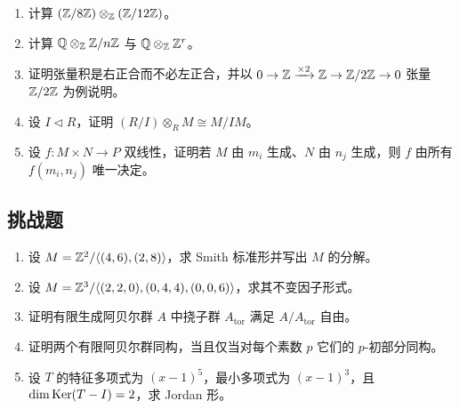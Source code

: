 \begin{enumerate}[resume, label=\textbf{\arabic*.}, leftmargin=*, itemsep=0.5em]
\item \medium 计算 $(\mathbb{Z}/8\mathbb{Z})\otimes_{\mathbb{Z}} (\mathbb{Z}/12\mathbb{Z})$。
\item \medium 计算 $\mathbb{Q}\otimes_{\mathbb{Z}} \mathbb{Z}/n\mathbb{Z}$ 与 $\mathbb{Q}\otimes_{\mathbb{Z}} \mathbb{Z}^r$。
\item \medium 证明张量积是右正合而不必左正合，并以 $0\to \mathbb{Z}\xrightarrow{\times 2}\mathbb{Z}\to \mathbb{Z}/2\mathbb{Z}\to 0$ 张量 $\mathbb{Z}/2\mathbb{Z}$ 为例说明。
\item \medium 设 $I\triangleleft R$，证明 $(R/I)\otimes_R M\cong M/IM$。
\item \medium 设 $f:M\times N\to P$ 双线性，证明若 $M$ 由 $m_i$ 生成、$N$ 由 $n_j$ 生成，则 $f$ 由所有 $f(m_i,n_j)$ 唯一决定。
\end{enumerate}

\subsection*{挑战题}
\begin{enumerate}[resume, label=\textbf{\arabic*.}, leftmargin=*, itemsep=0.5em]
\item \hard 设 $M=\mathbb{Z}^2/\langle (4,6),(2,8)\rangle$，求 Smith 标准形并写出 $M$ 的分解。
\item \hard 设 $M=\mathbb{Z}^3/\langle (2,2,0),(0,4,4),(0,0,6)\rangle$，求其不变因子形式。
\item \hard 证明有限生成阿贝尔群 $A$ 中挠子群 $A_{\mathrm{tor}}$ 满足 $A/A_{\mathrm{tor}}$ 自由。
\item \hard 证明两个有限阿贝尔群同构，当且仅当对每个素数 $p$ 它们的 $p$-初部分同构。
\item \hard 设 $T$ 的特征多项式为 $(x-1)^5$，最小多项式为 $(x-1)^3$，且 $\dim \mathrm{Ker}(T-I)=2$，求 Jordan 形。
\end{enumerate}

